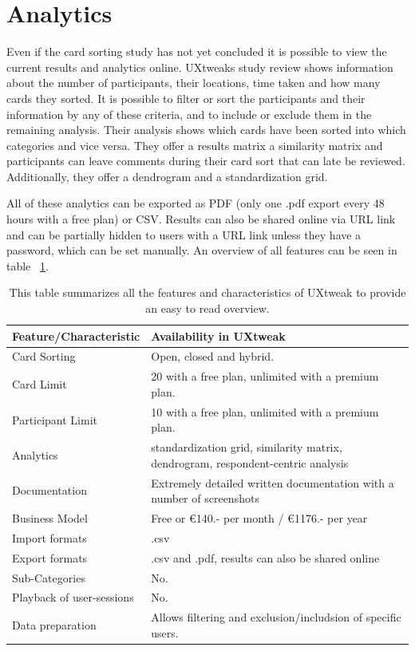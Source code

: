 \section{Analytics}
Even if the card sorting study has not yet concluded it is possible to view the 
current results and analytics online. UXtweaks study review shows information 
about the number of participants, their locations, time taken and how many 
cards they sorted. It is possible to filter or sort the participants and their 
information by any of these criteria, and to include or exclude them in the 
remaining analysis. Their analysis shows which cards have been sorted into 
which categories and vice versa. They offer a results matrix a similarity matrix
and participants can leave comments during their card sort that can late be 
reviewed. Additionally, they offer a dendrogram and a standardization grid.

All of these analytics can be exported as PDF (only one .pdf export every 48 
hours with a free plan) or CSV. Results can also be shared online via URL link 
and can be partially hidden to users with a URL link unless they have a 
password, which can be set manually. An overview of all features can be seen in
table ~\ref{tab:features-UXtweak}.

\begin{table}[tp]
\centering
\begin{tabularx}
{\linewidth}{|l|X|}
\hline \textbf{Feature/Characteristic} & \textbf{Availability in UXtweak} \\ 
\hline Card Sorting & Open, closed and hybrid. \\ 
\hline Card Limit & 20 with a free plan, unlimited with a premium plan. \\
\hline Participant Limit & 10 with a free plan, unlimited with a premium 
plan.\\
\hline Analytics & standardization grid, similarity matrix, dendrogram,
 respondent-centric analysis \\ 
\hline Documentation & Extremely detailed written documentation with a 
number of screenshots \\
\hline Business Model & Free or €140.- per month / €1176.- per year \\
\hline Import formats & .csv\\ 
\hline Export formats & .csv and .pdf, results can also be shared online \\ 
\hline Sub-Categories & No. \\ 
\hline Playback of user-sessions & No. \\ 
\hline Data preparation & Allows filtering and exclusion/includsion of specific
 users. \\ 
\hline
\end{tabularx} 
\caption[Feature summary of UXtweak] 
{ 
This table summarizes all the features and characteristics of UXtweak
to provide an easy to read overview.
}
\label{tab:features-UXtweak}
\end{table}


